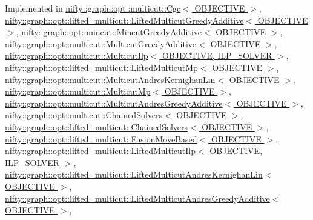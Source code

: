 Implemented in \hyperlink{classnifty_1_1graph_1_1opt_1_1multicut_1_1Cgc_a1280ab4b4cacaf7205c7d33951931460}{nifty\+::graph\+::opt\+::multicut\+::\+Cgc$<$ O\+B\+J\+E\+C\+T\+I\+V\+E $>$}, \hyperlink{classnifty_1_1graph_1_1opt_1_1lifted__multicut_1_1LiftedMulticutGreedyAdditive_a106015648a9e405c590a32303364e850}{nifty\+::graph\+::opt\+::lifted\+\_\+multicut\+::\+Lifted\+Multicut\+Greedy\+Additive$<$ O\+B\+J\+E\+C\+T\+I\+V\+E $>$}, \hyperlink{classnifty_1_1graph_1_1opt_1_1mincut_1_1MincutGreedyAdditive_a90776c1d69e006d6503007d8c870896b}{nifty\+::graph\+::opt\+::mincut\+::\+Mincut\+Greedy\+Additive$<$ O\+B\+J\+E\+C\+T\+I\+V\+E $>$}, \hyperlink{classnifty_1_1graph_1_1opt_1_1multicut_1_1MulticutGreedyAdditive_a9bd0f6adfa063efebca30424c4a109f5}{nifty\+::graph\+::opt\+::multicut\+::\+Multicut\+Greedy\+Additive$<$ O\+B\+J\+E\+C\+T\+I\+V\+E $>$}, \hyperlink{classnifty_1_1graph_1_1opt_1_1multicut_1_1MulticutIlp_a6851390d398b64c24315e60803aee297}{nifty\+::graph\+::opt\+::multicut\+::\+Multicut\+Ilp$<$ O\+B\+J\+E\+C\+T\+I\+V\+E, I\+L\+P\+\_\+\+S\+O\+L\+V\+E\+R $>$}, \hyperlink{classnifty_1_1graph_1_1opt_1_1lifted__multicut_1_1LiftedMulticutMp_a8038995b41fed867522a684985737020}{nifty\+::graph\+::opt\+::lifted\+\_\+multicut\+::\+Lifted\+Multicut\+Mp$<$ O\+B\+J\+E\+C\+T\+I\+V\+E $>$}, \hyperlink{classnifty_1_1graph_1_1opt_1_1multicut_1_1MulticutAndresKernighanLin_ab06bb2d0f90c255f35453aad5b06eea3}{nifty\+::graph\+::opt\+::multicut\+::\+Multicut\+Andres\+Kernighan\+Lin$<$ O\+B\+J\+E\+C\+T\+I\+V\+E $>$}, \hyperlink{classnifty_1_1graph_1_1opt_1_1multicut_1_1MulticutMp_a9b359aa0b88830fa4d44a4d115a06042}{nifty\+::graph\+::opt\+::multicut\+::\+Multicut\+Mp$<$ O\+B\+J\+E\+C\+T\+I\+V\+E $>$}, \hyperlink{classnifty_1_1graph_1_1opt_1_1multicut_1_1MulticutAndresGreedyAdditive_aed65f0ad0252b0cf069a969633271757}{nifty\+::graph\+::opt\+::multicut\+::\+Multicut\+Andres\+Greedy\+Additive$<$ O\+B\+J\+E\+C\+T\+I\+V\+E $>$}, \hyperlink{classnifty_1_1graph_1_1opt_1_1multicut_1_1ChainedSolvers_ad62c0b4a0b11f70020c9e668013aae6a}{nifty\+::graph\+::opt\+::multicut\+::\+Chained\+Solvers$<$ O\+B\+J\+E\+C\+T\+I\+V\+E $>$}, \hyperlink{classnifty_1_1graph_1_1opt_1_1lifted__multicut_1_1ChainedSolvers_a6c0b64e2271d19a8b8a10aebf390b530}{nifty\+::graph\+::opt\+::lifted\+\_\+multicut\+::\+Chained\+Solvers$<$ O\+B\+J\+E\+C\+T\+I\+V\+E $>$}, \hyperlink{classnifty_1_1graph_1_1opt_1_1lifted__multicut_1_1FusionMoveBased_ad9b947c6c21ec27063ca08f5a5671d90}{nifty\+::graph\+::opt\+::lifted\+\_\+multicut\+::\+Fusion\+Move\+Based$<$ O\+B\+J\+E\+C\+T\+I\+V\+E $>$}, \hyperlink{classnifty_1_1graph_1_1opt_1_1lifted__multicut_1_1LiftedMulticutIlp_a43a6e3211e79a7e95e8f063247372812}{nifty\+::graph\+::opt\+::lifted\+\_\+multicut\+::\+Lifted\+Multicut\+Ilp$<$ O\+B\+J\+E\+C\+T\+I\+V\+E, I\+L\+P\+\_\+\+S\+O\+L\+V\+E\+R $>$}, \hyperlink{classnifty_1_1graph_1_1opt_1_1lifted__multicut_1_1LiftedMulticutAndresKernighanLin_acd9b1de8aceaf4565c768303987e3c08}{nifty\+::graph\+::opt\+::lifted\+\_\+multicut\+::\+Lifted\+Multicut\+Andres\+Kernighan\+Lin$<$ O\+B\+J\+E\+C\+T\+I\+V\+E $>$}, \hyperlink{classnifty_1_1graph_1_1opt_1_1lifted__multicut_1_1LiftedMulticutAndresGreedyAdditive_aeada6b7d38bc3309ee96048bd41dc039}{nifty\+::graph\+::opt\+::lifted\+\_\+multicut\+::\+Lifted\+Multicut\+Andres\+Greedy\+Additive$<$ O\+B\+J\+E\+C\+T\+I\+V\+E $>$}, 